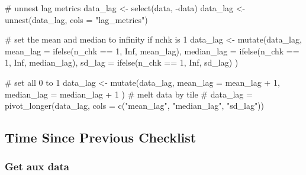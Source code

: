 \documentclass[
]{article}
\newenvironment{Shaded}{}{}
\newcommand{\CommentTok}[1]{\textcolor[rgb]{0.00,0.50,0.00}{#1}}
\newcommand{\DataTypeTok}[1]{#1}
\newcommand{\DecValTok}[1]{#1}
\newcommand{\KeywordTok}[1]{\textcolor[rgb]{0.00,0.00,1.00}{#1}}
\newcommand{\NormalTok}[1]{#1}
\newcommand{\OperatorTok}[1]{#1}
\newcommand{\OtherTok}[1]{\textcolor[rgb]{1.00,0.25,0.00}{#1}}
\newcommand{\StringTok}[1]{\textcolor[rgb]{0.00,0.50,0.50}{#1}}
\begin{document}
\begin{Shaded}
\begin{Highlighting}[]
\CommentTok{# unnest lag metrics}
\NormalTok{data_lag <-}\StringTok{ }\KeywordTok{select}\NormalTok{(data, }\OperatorTok{-}\NormalTok{data)}
\NormalTok{data_lag <-}\StringTok{ }\KeywordTok{unnest}\NormalTok{(data_lag, }\DataTypeTok{cols =} \StringTok{"lag_metrics"}\NormalTok{)}

\CommentTok{# set the mean and median to infinity if nchk is 1}
\NormalTok{data_lag <-}\StringTok{ }\KeywordTok{mutate}\NormalTok{(data_lag,}
  \DataTypeTok{mean_lag =} \KeywordTok{ifelse}\NormalTok{(n_chk }\OperatorTok{==}\StringTok{ }\DecValTok{1}\NormalTok{, }\OtherTok{Inf}\NormalTok{, mean_lag),}
  \DataTypeTok{median_lag =} \KeywordTok{ifelse}\NormalTok{(n_chk }\OperatorTok{==}\StringTok{ }\DecValTok{1}\NormalTok{, }\OtherTok{Inf}\NormalTok{, median_lag),}
  \DataTypeTok{sd_lag =} \KeywordTok{ifelse}\NormalTok{(n_chk }\OperatorTok{==}\StringTok{ }\DecValTok{1}\NormalTok{, }\OtherTok{Inf}\NormalTok{, sd_lag)}
\NormalTok{)}

\CommentTok{# set all 0 to 1}
\NormalTok{data_lag <-}\StringTok{ }\KeywordTok{mutate}\NormalTok{(data_lag,}
  \DataTypeTok{mean_lag =}\NormalTok{ mean_lag }\OperatorTok{+}\StringTok{ }\DecValTok{1}\NormalTok{,}
  \DataTypeTok{median_lag =}\NormalTok{ median_lag }\OperatorTok{+}\StringTok{ }\DecValTok{1}
\NormalTok{)}
\CommentTok{# melt data by tile}
\CommentTok{# data_lag = pivot_longer(data_lag, cols = c("mean_lag", "median_lag", "sd_lag"))}
\end{Highlighting}
\end{Shaded}

\hypertarget{time-since-previous-checklist}{%
\subsection{Time Since Previous Checklist}\label{time-since-previous-checklist}}

\hypertarget{get-aux-data}{%
\subsubsection{Get aux data}\label{get-aux-data}}
\end{document}
